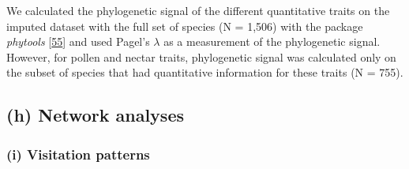 \documentclass[
  12pt,
  a4paper,
]{article}
\begin{document}
We calculated the phylogenetic signal of the different quantitative traits on the imputed dataset with the full set of species (N = 1,506) with the package \emph{phytools} {[}\protect\hyperlink{ref-revell2012}{55}{]} and used Pagel's \(\lambda\) as a measurement of the phylogenetic signal. However, for pollen and nectar traits, phylogenetic signal was calculated only on the subset of species that had quantitative information for these traits (N = 755).

\hypertarget{h-network-analyses}{%
\subsection{(h) Network analyses}\label{h-network-analyses}}

\hypertarget{i-visitation-patterns}{%
\subsubsection{(i) Visitation patterns}\label{i-visitation-patterns}}
\end{document}
